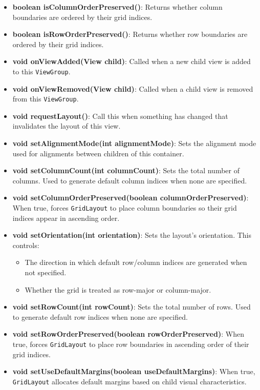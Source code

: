 \documentclass{report}
\begin{document}
\begin{itemize}
\begin{itemize}
                \item \textbf{boolean isColumnOrderPreserved()}: Returns whether column boundaries are ordered by their grid indices.
                \item \textbf{boolean isRowOrderPreserved()}: Returns whether row boundaries are ordered by their grid indices.
                \item \textbf{void onViewAdded(View child)}: Called when a new child view is added to this \texttt{ViewGroup}.
                \item \textbf{void onViewRemoved(View child)}: Called when a child view is removed from this \texttt{ViewGroup}.
                \item \textbf{void requestLayout()}: Call this when something has changed that invalidates the layout of this view.
                \item \textbf{void setAlignmentMode(int alignmentMode)}: Sets the alignment mode used for alignments between children of this container.
                \item \textbf{void setColumnCount(int columnCount)}: Sets the total number of columns. Used to generate default column indices when none are specified.
                \item \textbf{void setColumnOrderPreserved(boolean columnOrderPreserved)}: When true, forces \texttt{GridLayout} to place column boundaries so their grid indices appear in ascending order.
                \item \textbf{void setOrientation(int orientation)}: Sets the layout’s orientation. This controls:
                    \begin{itemize}
                        \item The direction in which default row/column indices are generated when not specified.
                        \item Whether the grid is treated as row-major or column-major.
                    \end{itemize}
                \item \textbf{void setRowCount(int rowCount)}: Sets the total number of rows. Used to generate default row indices when none are specified.
                \item \textbf{void setRowOrderPreserved(boolean rowOrderPreserved)}: When true, forces \texttt{GridLayout} to place row boundaries in ascending order of their grid indices.
                \item \textbf{void setUseDefaultMargins(boolean useDefaultMargins)}: When true, \texttt{GridLayout} allocates default margins based on child visual characteristics.

\end{itemize}
\end{itemize}
\end{document}

